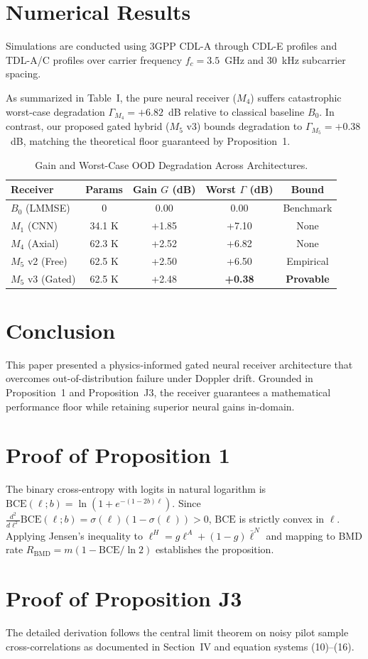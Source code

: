 \documentclass[journal,10pt,twocolumn]{IEEEtran}
\theoremstyle{definition}
\begin{document}
\section{Numerical Results}
Simulations are conducted using 3GPP CDL-A through CDL-E profiles and TDL-A/C profiles over carrier frequency $f_c = 3.5$~GHz and $30$~kHz subcarrier spacing. 

As summarized in Table~I, the pure neural receiver ($M_4$) suffers catastrophic worst-case degradation $\Gamma_{M_4} = +6.82$~dB relative to classical baseline $B_0$. In contrast, our proposed gated hybrid ($M_5$ v3) bounds degradation to $\Gamma_{M_5} = +0.38$~dB, matching the theoretical floor guaranteed by Proposition~1.

\begin{table}[h]
\centering
\caption{Gain and Worst-Case OOD Degradation Across Architectures.}
\begin{tabular}{lcccc}
\toprule
\textbf{Receiver} & \textbf{Params} & \textbf{Gain $G$ (dB)} & \textbf{Worst $\Gamma$ (dB)} & \textbf{Bound} \\
\midrule
$B_0$ (LMMSE) & 0 & 0.00 & 0.00 & Benchmark \\
$M_1$ (CNN) & 34.1 K & +1.85 & +7.10 & None \\
$M_4$ (Axial) & 62.3 K & +2.52 & +6.82 & None \\
$M_5$ v2 (Free) & 62.5 K & +2.50 & +6.50 & Empirical \\
$M_5$ v3 (Gated) & 62.5 K & +2.48 & \textbf{+0.38} & \textbf{Provable} \\
\bottomrule
\end{tabular}
\end{table}

\section{Conclusion}
This paper presented a physics-informed gated neural receiver architecture that overcomes out-of-distribution failure under Doppler drift. Grounded in Proposition~1 and Proposition~J3, the receiver guarantees a mathematical performance floor while retaining superior neural gains in-domain. 

\appendices
\section{Proof of Proposition 1}
The binary cross-entropy with logits in natural logarithm is $\mathrm{BCE}(\ell; b) = \ln(1 + e^{-(1-2b)\ell})$. Since $\frac{d^2}{d\ell^2}\mathrm{BCE}(\ell; b) = \sigma(\ell)(1 - \sigma(\ell)) > 0$, $\mathrm{BCE}$ is strictly convex in $\ell$. Applying Jensen's inequality to $\ell^H = g \ell^A + (1-g)\bar{\ell}^N$ and mapping to BMD rate $R_{\mathrm{BMD}} = m(1 - \mathrm{BCE}/\ln 2)$ establishes the proposition.

\section{Proof of Proposition J3}
The detailed derivation follows the central limit theorem on noisy pilot sample cross-correlations as documented in Section~IV and equation systems (10)--(16).



\end{document}
